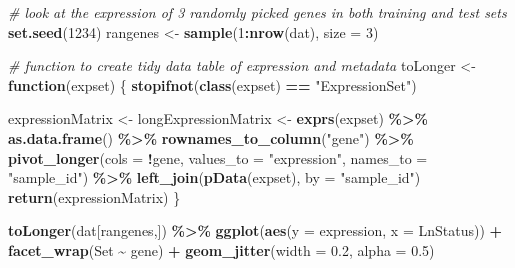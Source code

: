 \documentclass[
]{article}
\newenvironment{Shaded}{\begin{snugshade}}{\end{snugshade}}
\newcommand{\AttributeTok}[1]{\textcolor[rgb]{0.13,0.29,0.53}{#1}}
\newcommand{\CommentTok}[1]{\textcolor[rgb]{0.56,0.35,0.01}{\textit{#1}}}
\newcommand{\ControlFlowTok}[1]{\textcolor[rgb]{0.13,0.29,0.53}{\textbf{#1}}}
\newcommand{\DecValTok}[1]{\textcolor[rgb]{0.00,0.00,0.81}{#1}}
\newcommand{\FloatTok}[1]{\textcolor[rgb]{0.00,0.00,0.81}{#1}}
\newcommand{\FunctionTok}[1]{\textcolor[rgb]{0.13,0.29,0.53}{\textbf{#1}}}
\newcommand{\NormalTok}[1]{#1}
\newcommand{\OtherTok}[1]{\textcolor[rgb]{0.56,0.35,0.01}{#1}}
\newcommand{\SpecialCharTok}[1]{\textcolor[rgb]{0.81,0.36,0.00}{\textbf{#1}}}
\newcommand{\StringTok}[1]{\textcolor[rgb]{0.31,0.60,0.02}{#1}}
\begin{document}
\begin{Shaded}
\begin{Highlighting}[]
\CommentTok{\# look at the expression of 3 randomly picked genes in both training and test sets}
\FunctionTok{set.seed}\NormalTok{(}\DecValTok{1234}\NormalTok{)}
\NormalTok{rangenes }\OtherTok{\textless{}{-}} \FunctionTok{sample}\NormalTok{(}\DecValTok{1}\SpecialCharTok{:}\FunctionTok{nrow}\NormalTok{(dat), }\AttributeTok{size =} \DecValTok{3}\NormalTok{) }

\CommentTok{\# function to create tidy data table of expression and metadata}
\NormalTok{toLonger }\OtherTok{\textless{}{-}} \ControlFlowTok{function}\NormalTok{(expset) \{}
    \FunctionTok{stopifnot}\NormalTok{(}\FunctionTok{class}\NormalTok{(expset) }\SpecialCharTok{==} \StringTok{"ExpressionSet"}\NormalTok{)}
    
\NormalTok{    expressionMatrix }\OtherTok{\textless{}{-}}\NormalTok{ longExpressionMatrix }\OtherTok{\textless{}{-}} \FunctionTok{exprs}\NormalTok{(expset) }\SpecialCharTok{\%\textgreater{}\%} 
      \FunctionTok{as.data.frame}\NormalTok{() }\SpecialCharTok{\%\textgreater{}\%}
      \FunctionTok{rownames\_to\_column}\NormalTok{(}\StringTok{"gene"}\NormalTok{) }\SpecialCharTok{\%\textgreater{}\%}
      \FunctionTok{pivot\_longer}\NormalTok{(}\AttributeTok{cols =} \SpecialCharTok{!}\NormalTok{gene, }
                   \AttributeTok{values\_to =} \StringTok{"expression"}\NormalTok{,}
                   \AttributeTok{names\_to =} \StringTok{"sample\_id"}\NormalTok{) }\SpecialCharTok{\%\textgreater{}\%}
      \FunctionTok{left\_join}\NormalTok{(}\FunctionTok{pData}\NormalTok{(expset), }\AttributeTok{by =} \StringTok{"sample\_id"}\NormalTok{)}
  \FunctionTok{return}\NormalTok{(expressionMatrix)}
\NormalTok{\}}

\FunctionTok{toLonger}\NormalTok{(dat[rangenes,]) }\SpecialCharTok{\%\textgreater{}\%}
  \FunctionTok{ggplot}\NormalTok{(}\FunctionTok{aes}\NormalTok{(}\AttributeTok{y =}\NormalTok{ expression, }\AttributeTok{x =}\NormalTok{ LnStatus)) }\SpecialCharTok{+}
    \FunctionTok{facet\_wrap}\NormalTok{(Set }\SpecialCharTok{\textasciitilde{}}\NormalTok{ gene) }\SpecialCharTok{+}
    \FunctionTok{geom\_jitter}\NormalTok{(}\AttributeTok{width =} \FloatTok{0.2}\NormalTok{, }\AttributeTok{alpha =} \FloatTok{0.5}\NormalTok{)}
\end{Highlighting}
\end{Shaded}
\end{document}
